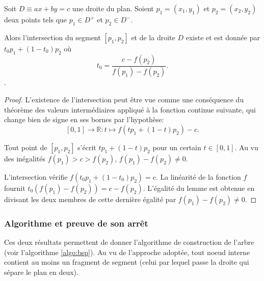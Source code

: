 \begin{lem}
  Soit $D\equiv ax + by = c$ une droite du plan. Soient $p_1 = (x_1, y_1)$
  et $p_2 = (x_2, y_2)$ deux points tels que $p_1\in D^+$ et $p_2\in D^-$.

  Alors l'intersection du segment $[p_1, p_2]$ et de la droite $D$
  existe et est donnée par $t_0p_1 + (1-t_0)p_2$
  où $$t_0 = \frac{c-f(p_2)}{f(p_1)-f(p_2)}.$$.
\end{lem}
\begin{proof}
  L'existence de l'intersection peut être vue comme une conséquence
  du théorème des valeurs intermédiaires appliqué à la fonction
  continue suivante, qui change bien de signe en ses bornes
  par l'hypothèse:
  $$[0, 1]\to\mathbb R: t\mapsto f(tp_1 + (1 - t) p_2)- c.$$

  Tout point de $[p_1, p_2]$ s'écrit $tp_1 + (1-t)p_2$ pour un certain
  $t\in [0, 1]$. Au vu des inégalités $f(p_1)>c>f(p_2)$,
  $f(p_1)- f(p_2)\neq 0$.

  L'intersection vérifie $f(t_0p_1 + (1-t_0)p_2) = c$. La linéarité de la
  fonction $f$ fournit $t_0(f(p_1) - f(p_2)) = c - f(p_2)$. L'égalité
  du lemme est  obtenue en divisant les deux membres
  de cette dernière égalité par $f(p_1) - f(p_2)\neq 0$.
\end{proof}
\subsubsection*{Algorithme et preuve de son arrêt}
Ces deux résultats permettent de donner l'algorithme de construction de
l'arbre (voir l'algorithme \ref{algo:bsp}). Au vu de l'approche adoptée,
tout noeud interne contient au moins un fragment de segment (celui
par lequel passe la droite qui sépare le plan en deux).

